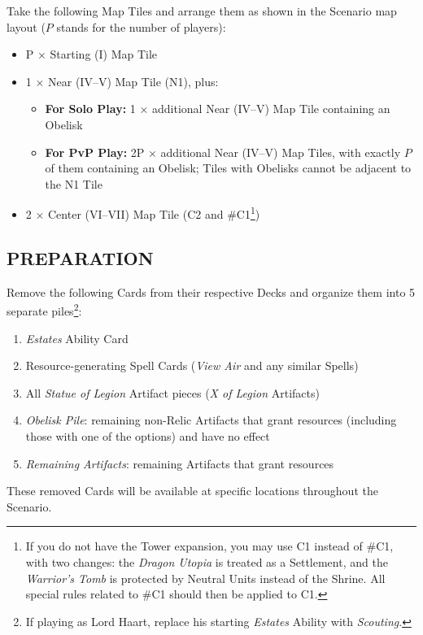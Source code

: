 \begin{multicols}{2}
Take the following Map Tiles and arrange them as shown in the Scenario map layout ($P$ stands for the number of players):
\begin{itemize}
  \item P × Starting (I) Map Tile
  \item 1 × Near (IV--V) Map Tile (N1), plus:
  \begin{itemize}
    \item \textbf{For Solo Play:} 1 × additional Near (IV--V) Map Tile containing an Obelisk
    \item \textbf{For PvP Play:} 2P × additional Near (IV--V) Map Tiles, with exactly $P$ of them containing an Obelisk; Tiles with Obelisks cannot be adjacent to the N1 Tile
  \end{itemize}
  \item 2 × Center (VI--VII) Map Tile (C2 and \#C1\footnote{If you do not have the Tower expansion, you may use C1 instead of \#C1, with two changes: the \textit{Dragon Utopia} is treated as a Settlement, and the \textit{Warrior's Tomb} is protected by Neutral Units instead of the Shrine. All special rules related to \#C1 should then be applied to C1.})
\end{itemize}
\subsection*{\MakeUppercase{Preparation}}

Remove the following Cards from their respective Decks and organize them into 5 separate piles\footnote{If playing as Lord Haart, replace his starting \textit{Estates} Ability with \textit{Scouting}.}:

\begin{enumerate}
  \item \textit{Estates} Ability Card
  \item Resource-generating Spell Cards (\textit{View Air} and any similar Spells)
  \item All \textit{Statue of Legion} Artifact pieces (\textit{X of Legion} Artifacts)
  \item \textit{Obelisk Pile}: remaining non-Relic Artifacts that grant resources (including those with one of the options) and have no  effect
  \item \textit{Remaining Artifacts}: remaining Artifacts that grant resources
\end{enumerate}

These removed Cards will be available at specific locations throughout the Scenario.


\end{multicols}
